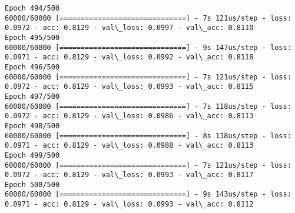 \documentclass[11pt]{article}
\begin{document}
\begin{Verbatim}[commandchars=\\\{\}]
Epoch 494/500
60000/60000 [==============================] - 7s 121us/step - loss: 0.0972 - acc: 0.8129 - val\_loss: 0.0997 - val\_acc: 0.8110
Epoch 495/500
60000/60000 [==============================] - 9s 147us/step - loss: 0.0971 - acc: 0.8129 - val\_loss: 0.0992 - val\_acc: 0.8118
Epoch 496/500
60000/60000 [==============================] - 7s 121us/step - loss: 0.0972 - acc: 0.8129 - val\_loss: 0.0993 - val\_acc: 0.8115
Epoch 497/500
60000/60000 [==============================] - 7s 118us/step - loss: 0.0972 - acc: 0.8129 - val\_loss: 0.0986 - val\_acc: 0.8113
Epoch 498/500
60000/60000 [==============================] - 8s 138us/step - loss: 0.0971 - acc: 0.8129 - val\_loss: 0.0988 - val\_acc: 0.8113
Epoch 499/500
60000/60000 [==============================] - 7s 121us/step - loss: 0.0972 - acc: 0.8129 - val\_loss: 0.0993 - val\_acc: 0.8117
Epoch 500/500
60000/60000 [==============================] - 9s 143us/step - loss: 0.0971 - acc: 0.8129 - val\_loss: 0.0993 - val\_acc: 0.8112

    \end{Verbatim}
\end{document}
